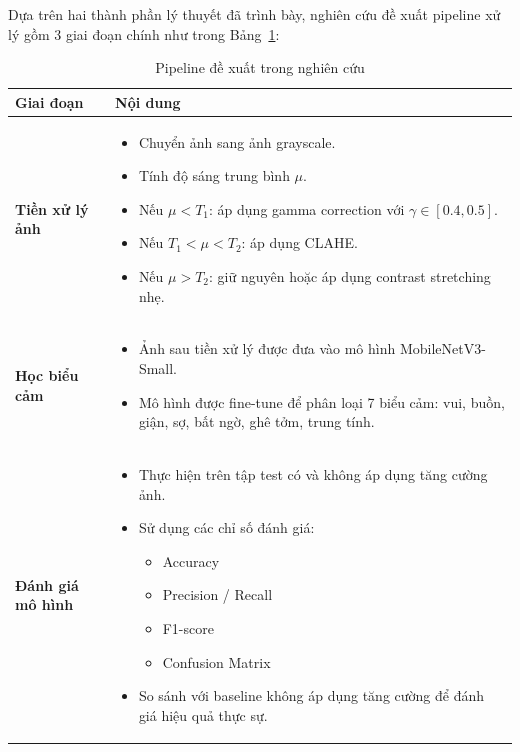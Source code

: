 Dựa trên hai thành phần lý thuyết đã trình bày, nghiên cứu đề xuất pipeline xử lý gồm 3 giai đoạn chính như trong Bảng~\ref{tab:pipeline}:

\begin{table}[H]
\centering
\caption{Pipeline đề xuất trong nghiên cứu}
\label{tab:pipeline}
\begin{tabular}{|p{4cm}|p{10cm}|}
\hline
\textbf{Giai đoạn} & \textbf{Nội dung} \\
\hline
\textbf{Tiền xử lý ảnh} &
\begin{itemize}[leftmargin=*]
    \item Chuyển ảnh sang ảnh grayscale.
    \item Tính độ sáng trung bình $\mu$.
    \item Nếu $\mu < T_1$: áp dụng gamma correction với $\gamma \in [0.4, 0.5]$.
    \item Nếu $T_1 < \mu < T_2$: áp dụng CLAHE.
    \item Nếu $\mu > T_2$: giữ nguyên hoặc áp dụng contrast stretching nhẹ.
\end{itemize} \\
\hline
\textbf{Học biểu cảm} &
\begin{itemize}[leftmargin=*]
    \item Ảnh sau tiền xử lý được đưa vào mô hình MobileNetV3-Small.
    \item Mô hình được fine-tune để phân loại 7 biểu cảm: vui, buồn, giận, sợ, bất ngờ, ghê tởm, trung tính.
\end{itemize} \\
\hline
\textbf{Đánh giá mô hình} &
\begin{itemize}[leftmargin=*]
    \item Thực hiện trên tập test có và không áp dụng tăng cường ảnh.
    \item Sử dụng các chỉ số đánh giá:
    \begin{itemize}
        \item Accuracy
        \item Precision / Recall
        \item F1-score
        \item Confusion Matrix
    \end{itemize}
    \item So sánh với baseline không áp dụng tăng cường để đánh giá hiệu quả thực sự.
\end{itemize} \\
\hline
\end{tabular}
\end{table}
